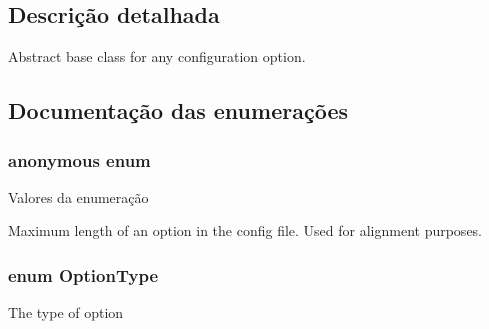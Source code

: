 \subsection{Descrição detalhada}
Abstract base class for any configuration option. 

\subsection{Documentação das enumerações}
\hypertarget{class_config_option_a61dadd085c1777f559549e05962b2c9e}{\subsubsection[{anonymous enum}]{\setlength{\rightskip}{0pt plus 5cm}anonymous enum}}\label{class_config_option_a61dadd085c1777f559549e05962b2c9e}
\begin{Desc}
\item[Valores da enumeração]\par
\begin{description}
\item[{\em 
\hypertarget{class_config_option_a61dadd085c1777f559549e05962b2c9eaf9043652ab6c0a36c22f6bdea78d1d5a}{M\-A\-X\-\_\-\-O\-P\-T\-I\-O\-N\-\_\-\-L\-E\-N\-G\-T\-H}\label{class_config_option_a61dadd085c1777f559549e05962b2c9eaf9043652ab6c0a36c22f6bdea78d1d5a}
}]Maximum length of an option in the config file. Used for alignment purposes. \end{description}
\end{Desc}
\hypertarget{class_config_option_a976bded296a67e09242af85291a639d6}{
\subsubsection[{Option\-Type}]{\setlength{\rightskip}{0pt plus 5cm}enum {\bf Option\-Type}}}\label{class_config_option_a976bded296a67e09242af85291a639d6}
The type of option 

